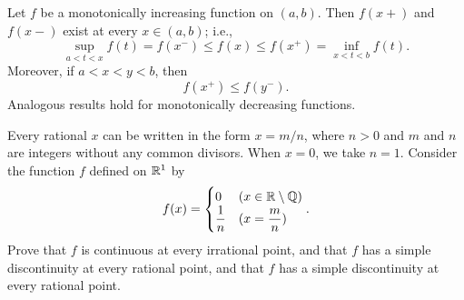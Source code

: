 \begin{theorem}[29]
	Let $f$ be a monotonically increasing function on $(a,b)$. Then $f(x+)$ and $f(x-)$ exist at every $x \in (a,b)$; i.e.,
	\[
		\sup_{a<t<x}f(t)=f(x^{-})\le f(x)\le f(x^{+})=\inf_{x<t<b}f(t)
		.\]
	Moreover, if $a<x<y<b$, then
	\[
		f(x^{+})\le f(y^{-})
		.\]
	Analogous results hold for monotonically decreasing functions.
\end{theorem}


\begin{example}[18]
	Every rational $x$ can be written in the form $x=m/n$, where $n>0$ and $m$ and $n$ are integers without any common divisors. When $x=0$, we take $n=1$. Consider the function $f$ defined on $\mathbb{R}^{1}$ by
	\[
		f(x)=
		\begin{cases}
			0            & (x \in \mathbb{R}\setminus \mathbb{Q}) \\
			\dfrac{1}{n} & (x=\dfrac{m}{n})
		\end{cases}
		.\]
	Prove that $f$ is continuous at every irrational point, and that $f$ has a simple discontinuity at every rational point, and that $f$ has a simple discontinuity at every rational point.
\end{example}
